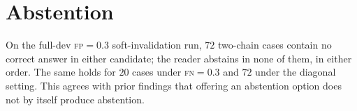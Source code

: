 \documentclass[11pt]{article}
\begin{document}
\section{Abstention}
\label{sec:abstain}

On the full-dev \textsc{fp}$=0.3$ soft-invalidation run, $72$ two-chain cases contain no correct
answer in either candidate; the reader abstains in none of them, in either order. The same holds for
$20$ cases under \textsc{fn}$=0.3$ and $72$ under the diagonal setting. This agrees with prior findings
that offering an abstention option does not by itself produce abstention.
\end{document}
